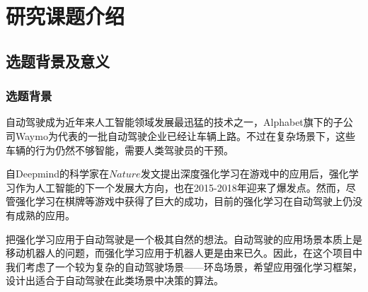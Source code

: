 \documentclass[degree=bachelor, tocarialchapter, pifootnote]{thuthesis}
\begin{document}
\frontmatter

\makecover

\setcounter{secnumdepth}{5}
\setcounter{tocdepth}{5}
\tableofcontents




\mainmatter
%
%
\renewcommand\thesection{\arabic {section}} %

\section{研究课题介绍}
  \subsection{选题背景及意义}
    \subsubsection{选题背景}
      自动驾驶成为近年来人工智能领域发展最迅猛的技术之一，Alphabet旗下的子公司Waymo为代表的一批自动驾驶企业已经让车辆上路\cite{waymo}。不过在复杂场景下，这些车辆的行为仍然不够智能，需要人类驾驶员的干预。\par
      自Deepmind的科学家在$Nature$发文提出深度强化学习在游戏中的应用后\cite{nature2015}，强化学习作为人工智能的下一个发展大方向，也在2015-2018年迎来了爆发点。然而，尽管强化学习在棋牌等游戏中获得了巨大的成功，目前的强化学习在自动驾驶上仍没有成熟的应用。\par
      把强化学习应用于自动驾驶是一个极其自然的想法。自动驾驶的应用场景本质上是移动机器人的问题，而强化学习应用于机器人更是由来已久\cite{RL_in_robotics}\cite{Model-Based_RL_robotics}\cite{DRL_for_driving}。因此，在这个项目中我们考虑了一个较为复杂的自动驾驶场景——环岛场景，希望应用强化学习框架，设计出适合于自动驾驶在此类场景中决策的算法。
    
\end{document}
